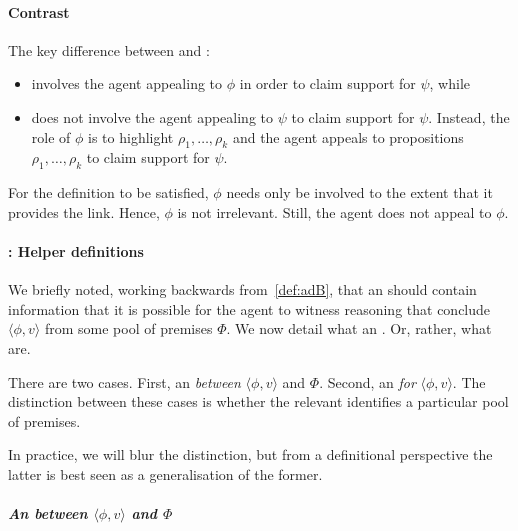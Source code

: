 \paragraph{Contrast}

\begin{note}
  The key difference between \adA{} and \adB{}:
  \begin{itemize}
  \item \adA{} involves the agent appealing to \(\phi\) in order to claim support for \(\psi\), while
  \item \adB{} does not involve the agent appealing to \(\psi\) to claim support for \(\psi\).
    Instead, the role of \(\phi\) is to highlight \(\rho_{1},\dots,\rho_{k}\) and the agent appeals to propositions \(\rho_{1},\dots,\rho_{k}\) to claim support for \(\psi\).
  \end{itemize}

  For the definition to be satisfied, \(\phi\) needs only be involved to the extent that it provides the link.
  Hence, \(\phi\) is not irrelevant.
  Still, the agent does not appeal to \(\phi\).
\end{note}

\paragraph*{\adB{}: Helper definitions}

\begin{note}[]
  We briefly noted, working backwards from~\autoref{def:adB}, that an \itp{} should contain information that it is possible for the agent to witness reasoning that conclude \(\langle \phi,v \rangle\) from some pool of premises \(\Phi\).
  We now detail what an .
  Or, rather, what  are.

  There are two cases.
  First, an  \emph{between} \(\langle \phi,v \rangle\) and \(\Phi\).
  Second, an  \emph{for} \(\langle \phi,v \rangle\).
  The distinction between these cases is whether the relevant  identifies a particular pool of premises.

  In practice, we will blur the distinction, but from a definitional perspective the latter is best seen as a generalisation of the former.
\end{note}

\subparagraph*{An  between \(\langle \phi,v \rangle\) and \(\Phi\)}

